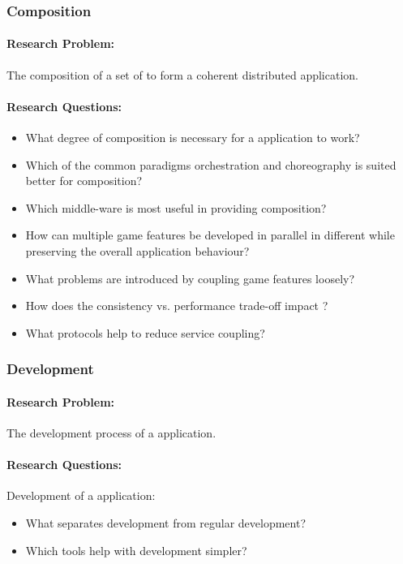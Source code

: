 \subsubsection{\ms{} Composition}
\paragraph{Research Problem:} The composition of a set of \mss{} to form a coherent
distributed application.

\paragraph{Research Questions:}
\begin{itemize}
  \item What degree of composition is necessary for a \ms{} application
  to work?
  \item Which of the common paradigms orchestration and choreography is suited
  better for \ms{} composition?
  \item Which middle-ware is most useful in providing \ms{} composition?
  \item How can multiple game features be developed in parallel in different
\mss{} while preserving the overall application behaviour?
  \item What problems are introduced by coupling game features loosely?
  \item How does the consistency vs. performance trade-off impact \ogs{}?
  \item What protocols help to reduce service coupling?
\end{itemize}

\subsubsection{\ms{} Development}
\paragraph{Research Problem:} The development process of a \ms{} application.

\paragraph{Research Questions:}

Development of a \ms{} application:
\begin{itemize}
  \item What separates \ms{} development from regular development?
  \item Which tools help with \ms{} development simpler?
\end{itemize}

